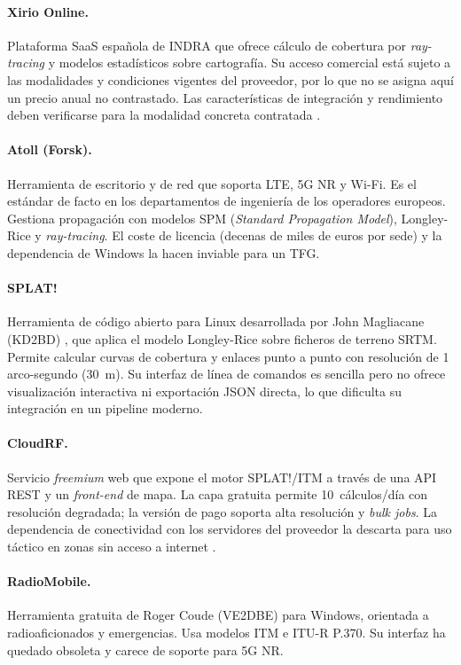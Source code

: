 \paragraph{Xirio Online.} Plataforma SaaS española de INDRA que ofrece cálculo de
cobertura por \textit{ray-tracing} y modelos estadísticos sobre cartografía. Su acceso
comercial está sujeto a las modalidades y condiciones vigentes del proveedor, por lo que
no se asigna aquí un precio anual no contrastado. Las características de integración y
rendimiento deben verificarse para la modalidad concreta contratada \cite{xirio2024}.

\paragraph{Atoll (Forsk).} Herramienta de escritorio y de red que soporta LTE, 5G NR y
Wi-Fi. Es el estándar de facto en los departamentos de ingeniería de los operadores europeos.
Gestiona propagación con modelos SPM (\textit{Standard Propagation Model}), Longley-Rice y
\textit{ray-tracing}. El coste de licencia (decenas de miles de euros por sede) y la
dependencia de Windows la hacen inviable para un TFG.

\paragraph{SPLAT!} Herramienta de código abierto para Linux desarrollada por John
Magliacane (KD2BD) \cite{splat2011}, que aplica el modelo Longley-Rice sobre ficheros de
terreno SRTM. Permite calcular curvas de cobertura y enlaces punto a punto con resolución
de 1 arco-segundo (30~m). Su interfaz de línea de comandos es sencilla pero no ofrece
visualización interactiva ni exportación JSON directa, lo que dificulta su integración en
un pipeline moderno.

\paragraph{CloudRF.} Servicio \textit{freemium} web que expone el motor SPLAT!/ITM a
través de una API REST y un \textit{front-end} de mapa. La capa gratuita permite
10~cálculos/día con resolución degradada; la versión de pago soporta alta resolución y
\textit{bulk jobs}. La dependencia de conectividad con los servidores del proveedor la
descarta para uso táctico en zonas sin acceso a internet \cite{cloudrf2024}.

\paragraph{RadioMobile.} Herramienta gratuita de Roger Coude (VE2DBE) para Windows,
orientada a radioaficionados y emergencias. Usa modelos ITM e ITU-R P.370. Su interfaz
ha quedado obsoleta y carece de soporte para 5G NR.

